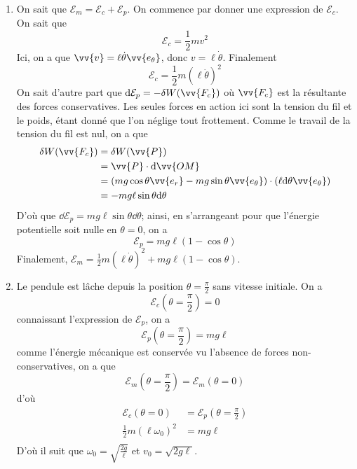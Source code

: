 \documentclass[17pt]{article}
\newcommand{\dW}[1]{\delta W(\vv{#1})}
\def\Em{\mathcal{E}_m}
\def\Ec{\mathcal{E}_c}
\def\Ep{\mathcal{E}_p}
\begin{document}
	\begin{enumerate}
		\item On sait que $\Em=\Ec+\Ep$. On commence par donner une expression de $\Ec$. On sait que \[\Ec = \frac12mv^2\]
		Ici, on a que $\vv{v}=\ell\dot{\theta}\vv{e_\theta}$, donc $v=\ell\dot{\theta}$. Finalement \[\boxed{\Ec=\frac12m(\ell\dot{\theta})^2}\]
		On sait d'autre part que $\dd\Ep=-\delta W(\vv{F_c})$ où $\vv{F_c}$ est la résultante des forces conservatives. Les seules forces en action ici sont la tension du fil et le poids, étant donné que l'on néglige tout frottement. Comme le travail de la tension du fil est nul, on a que
		\begin{align*}
			\dW{F_c} &= \dW{P}\\
					 &= \vv{P}\cdot \dd \vv{OM}\\
					 &= (mg\cos\theta\vv{e_r}-mg\sin\theta\vv{e_\theta})\cdot(\ell\dd\theta\vv{e_\theta})\\
					 &= -mg\ell\sin\theta\dd\theta
		\end{align*}
		D'où que $\dd\Ep=mg\ell\sin\theta\dd\theta$; ainsi, en s'arrangeant pour que l'énergie potentielle soit nulle en $\theta=0$, on a \[\boxed{\Ep=mg\ell(1-\cos\theta)}\] 
		Finalement, $\boxed{\Em=\frac12m(\ell\dot{\theta})^2+mg\ell(1-\cos\theta)}$.
		\item Le pendule est lâche depuis la position $\theta=\frac\pi2$ sans vitesse initiale. On a \[\Ec\left(\theta=\frac\pi2\right)=0\]
		connaissant l'expression de $\Ep$, on a \[\Ep\left(\theta=\frac\pi2\right)=mg\ell\]
		comme l'énergie mécanique est conservée vu l'absence de forces non-conservatives, on a que \[\Em\left(\theta=\frac\pi2\right)=\Em(\theta=0)\]
		d'où 
		\begin{align*}
			\Ec(\theta=0) 			 &= \Ep\left(\theta=\frac\pi2\right)\\
			\frac12m(\ell\omega_0)^2 &= mg\ell\\
		\end{align*}
		D'où il suit que $\boxed{\omega_0=\sqrt{\frac{2g}\ell}}$ et $\boxed{v_0=\sqrt{2g\ell}}$.
	\end{enumerate}
\end{document}
